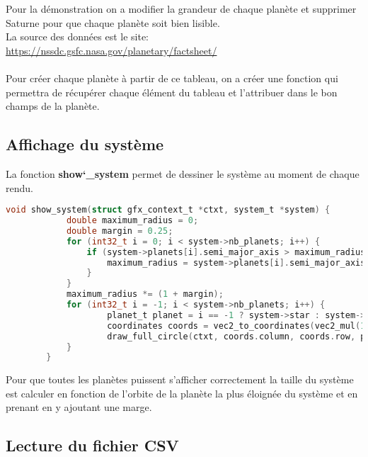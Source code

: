 \documentclass[a4paper,10pt]{article}
\begin{document}
    Pour la démonstration on a modifier la grandeur de chaque planète et supprimer Saturne pour que chaque planète soit bien lisible.\\
    La source des données est le site: \href{https://nssdc.gsfc.nasa.gov/planetary/factsheet/}{https://nssdc.gsfc.nasa.gov/planetary/factsheet/} \\\\
    
    Pour créer chaque planète à partir de ce tableau, on a créer une fonction qui permettra de récupérer chaque élément du tableau et l'attribuer dans le bon champs de la planète.
    
    \subsection{Affichage du système}\label{subsec:affichage-du-système}

    La fonction \textbf{show\char`_system} permet de dessiner le système au moment de chaque rendu.

    \begin{lstlisting}[language=c,label={lst:lstlisting8}]
        void show_system(struct gfx_context_t *ctxt, system_t *system) {
            double maximum_radius = 0;
            double margin = 0.25;
            for (int32_t i = 0; i < system->nb_planets; i++) {
                if (system->planets[i].semi_major_axis > maximum_radius) {
                    maximum_radius = system->planets[i].semi_major_axis;
                }
            }
            maximum_radius *= (1 + margin);
            for (int32_t i = -1; i < system->nb_planets; i++) {
                    planet_t planet = i == -1 ? system->star : system->planets[i];
                    coordinates coords = vec2_to_coordinates(vec2_mul(1.0 / maximum_radius, planet.pos), SCREEN_WIDTH, SCREEN_HEIGHT);
                    draw_full_circle(ctxt, coords.column, coords.row, planet.radius, planet.color);
            }
        }
    \end{lstlisting}

    Pour que toutes les planètes puissent s'afficher correctement la taille du système est calculer en fonction de l'orbite de la planète la plus éloignée du système et en prenant en y ajoutant une marge.

    \subsection{Lecture du fichier CSV}\label{subsec:lecture-du-fichier-csv}
\end{document}
